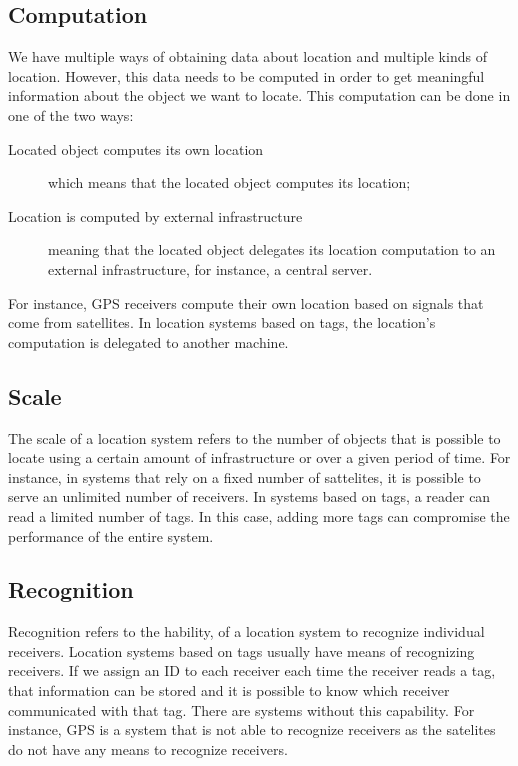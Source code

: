 \subsection{Computation}
\label{sub:background_computation}
We have multiple ways of obtaining data about location and multiple kinds of location.
However, this data needs to be computed in order to get meaningful information about the object we want to locate.
This computation can be done in one of the two ways:
\begin{description}
  \item[Located object computes its own location] which means that the located object computes its location;
  \item[Location is computed by external infrastructure] meaning that the located object delegates its location computation to an external infrastructure, for instance, a central server.
\end{description}

For instance, \gls{GPS} receivers compute their own location based on signals that come from satellites.
In location systems based on tags, the location's computation is delegated to another machine.

\subsection{Scale}
\label{sub:background_scale}
The scale of a location system refers to the number of objects that is possible to locate using a certain amount of infrastructure or over a given period of time.
For instance, in systems that rely on a fixed number of sattelites, it is possible to serve an unlimited number of receivers.
In systems based on tags, a reader can read a limited number of tags.
In this case, adding more tags can compromise the performance of the entire system.

\subsection{Recognition}
\label{sub:background_recognition}
Recognition refers to the hability, of a location system to recognize individual receivers.
Location systems based on tags usually have means of recognizing receivers.
If we assign an \gls{ID} to each receiver each time the receiver reads a tag, that information can be stored and it is possible to know which receiver communicated with that tag.
There are systems without this capability.
For instance, \gls{GPS} is a system that is not able to recognize receivers as the satelites do not have any means to recognize receivers.

